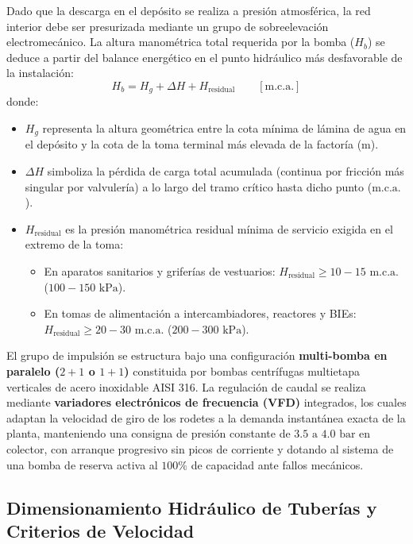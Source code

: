 \documentclass{report}
\begin{document}
Dado que la descarga en el depósito se realiza a presión atmosférica, la red interior debe ser presurizada mediante un grupo de sobreelevación electromecánico. La altura manométrica total requerida por la bomba ($H_b$) se deduce a partir del balance energético en el punto hidráulico más desfavorable de la instalación:
\begin{equation}
    H_b = H_g + \Delta H + H_{\text{residual}} \qquad [\text{m.c.a.}]
    \label{eq:altura_manometrica_bomba}
\end{equation}
donde:
\begin{itemize}
    \item $H_g$ representa la altura geométrica entre la cota mínima de lámina de agua en el depósito y la cota de la toma terminal más elevada de la factoría ($\text{m}$).
    \item $\Delta H$ simboliza la pérdida de carga total acumulada (continua por fricción más singular por valvulería) a lo largo del tramo crítico hasta dicho punto ($\text{m.c.a.}$).
    \item $H_{\text{residual}}$ es la presión manométrica residual mínima de servicio exigida en el extremo de la toma:
          \begin{itemize}
              \item En aparatos sanitarios y griferías de vestuarios: $H_{\text{residual}} \ge 10 - 15\text{ m.c.a.}$ ($100 - 150\text{ kPa}$).
              \item En tomas de alimentación a intercambiadores, reactores y BIEs: $H_{\text{residual}} \ge 20 - 30\text{ m.c.a.}$ ($200 - 300\text{ kPa}$).
          \end{itemize}
\end{itemize}

El grupo de impulsión se estructura bajo una configuración \textbf{multi-bomba en paralelo ($2+1$ o $1+1$)} constituida por bombas centrífugas multietapa verticales de acero inoxidable AISI 316. La regulación de caudal se realiza mediante \textbf{variadores electrónicos de frecuencia (VFD)} integrados, los cuales adaptan la velocidad de giro de los rodetes a la demanda instantánea exacta de la planta, manteniendo una consigna de presión constante de $3.5\text{ a }4.0\text{ bar}$ en colector, con arranque progresivo sin picos de corriente y dotando al sistema de una bomba de reserva activa al $100\%$ de capacidad ante fallos mecánicos.

\subsection{Dimensionamiento Hidráulico de Tuberías y Criterios de Velocidad}
\end{document}
